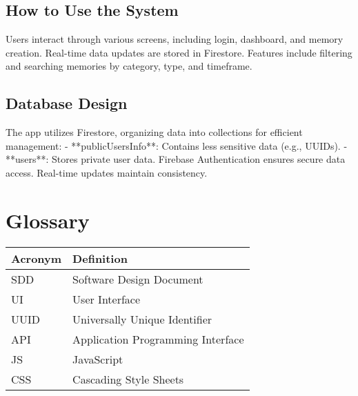\documentclass{article}
\begin{document}
\subsection{How to Use the System}
Users interact through various screens, including login, dashboard, and memory creation. Real-time data updates are stored in Firestore. Features include filtering and searching memories by category, type, and timeframe.

\subsection{Database Design}
The app utilizes Firestore, organizing data into collections for efficient management:
- **publicUsersInfo**: Contains less sensitive data (e.g., UUIDs).
- **users**: Stores private user data.
Firebase Authentication ensures secure data access. Real-time updates maintain consistency.

\section{Glossary}
\begin{tabular}{|l|p{10cm}|}
\hline
\textbf{Acronym} & \textbf{Definition} \\ \hline
SDD & Software Design Document \\ \hline
UI & User Interface \\ \hline
UUID & Universally Unique Identifier \\ \hline
API & Application Programming Interface \\ \hline
JS & JavaScript \\ \hline
CSS & Cascading Style Sheets \\ \hline
\end{tabular}
\end{document}
